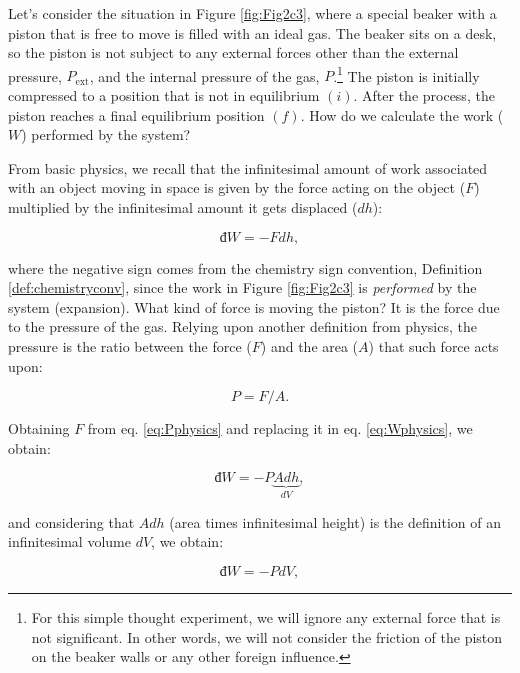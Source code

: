 \documentclass[
  9pt,
]{extbook}
\theoremstyle{definition}
\theoremstyle{definition}
\theoremstyle{definition}
\theoremstyle{definition}
\theoremstyle{remark}
\begin{document}
Let's consider the situation in Figure \ref{fig:Fig2c3}, where a special beaker with a piston that is free to move is filled with an ideal gas. The beaker sits on a desk, so the piston is not subject to any external forces other than the external pressure, \(P_{\text{ext}}\), and the internal pressure of the gas, \(P\).\footnote{For this simple thought experiment, we will ignore any external force that is not significant. In other words, we will not consider the friction of the piston on the beaker walls or any other foreign influence.} The piston is initially compressed to a position that is not in equilibrium \((i)\). After the process, the piston reaches a final equilibrium position \((f)\). How do we calculate the work (\(W\)) performed by the system?

From basic physics, we recall that the infinitesimal amount of work associated with an object moving in space is given by the force acting on the object (\(F\)) multiplied by the infinitesimal amount it gets displaced (\(d h\)):

\begin{equation}
  đ W = - Fdh,
  \label{eq:Wphysics}
\end{equation}

where the negative sign comes from the chemistry sign convention, Definition \ref{def:chemistryconv}, since the work in Figure \ref{fig:Fig2c3} is \emph{performed} by the system (expansion). What kind of force is moving the piston? It is the force due to the pressure of the gas. Relying upon another definition from physics, the pressure is the ratio between the force (\(F\)) and the area (\(A\)) that such force acts upon:

\begin{equation}
  P = F/A.
  \label{eq:Pphysics}
\end{equation}

Obtaining \(F\) from eq. \eqref{eq:Pphysics} and replacing it in eq. \eqref{eq:Wphysics}, we obtain:

\begin{equation}
  đ W = - P \underbrace{Adh}_{dV},
  \label{eq:Wphysics2}
\end{equation}

and considering that \(Adh\) (area times infinitesimal height) is the definition of an infinitesimal volume \(dV\), we obtain:

\begin{equation}
  đ W = - PdV,
  \label{eq:Wdef}
\end{equation}
\end{document}
